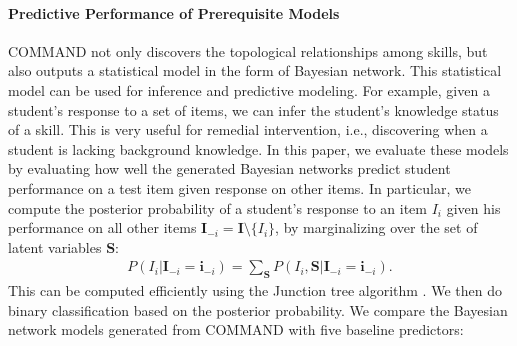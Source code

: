 \documentclass{edm_template}
\begin{document}
	\paragraph{Predictive Performance of Prerequisite Models}
	\label{sec:predictive_performance}
	COMMAND not only discovers the topological relationships among skills, but also outputs a statistical model in the form of Bayesian network.
	This statistical model can be used for inference and predictive modeling.
	For example, given a student's response to a set of items, we can infer the student's knowledge status of a skill.
	This is very useful for remedial intervention, i.e., discovering when a student is lacking background knowledge. 
	In this paper, we evaluate these models by evaluating how well the generated Bayesian networks predict student performance
	on a test item given response on other items.
	In particular, we compute the posterior probability of a student's response to an item $I_i$ given his performance on all other items 
	$\mathbf{I}_{-i}=\mathbf{I}\setminus\{I_i\}$, by marginalizing over the set of latent variables $\mathbf{S}$:
	\begin{align}
		P(I_i|\mathbf{I}_{-i}=\mathbf{i}_{-i}) =\sum_{\mathbf{S}}P(I_i, \mathbf{S}|\mathbf{I}_{-i}=\mathbf{i}_{-i}).
	\end{align}
	This can be computed efficiently using the Junction tree algorithm \cite{koller2009probabilistic}. 
	We then do binary classification based on the posterior probability.
	We compare the Bayesian network models generated from COMMAND with five baseline predictors:
\end{document}
